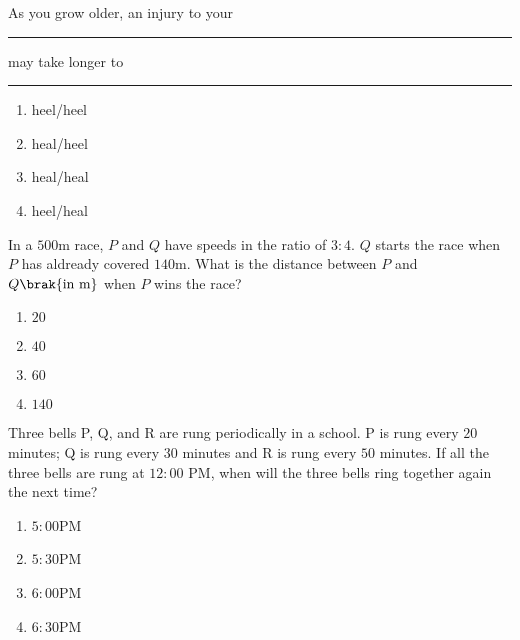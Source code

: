 \iffalse
	\title{2022-EE-1-13}
	\author{EE24Btech11006 - Arnav Mahishi}
	\section{ee}
	\chapter{2022}
\fi
\item{
As you grow older, an injury to your \rule{1cm}{0.15mm} may take longer to \rule{1cm}{0.15mm}
\begin{multicols}{4}
\begin{enumerate}
\item heel/heel
\item heal/heel
\item heal/heal 
\item heel/heal
\end{enumerate}
\end{multicols}
}
\item{
In a $500$m race, $P$ and $Q$ have speeds in the ratio of $3:4$. $Q$ starts the race when $P$ has aldready covered $140$m. What is the distance between $P$ and $Q\brak{\text{in m}}$ when $P$ wins the race?
\begin{multicols}{4}
\begin{enumerate}
\item $20$
\item $40$
\item $60$
\item $140$
\end{enumerate}
\end{multicols}}
\item{
Three bells P, Q, and R are rung periodically in a school. P is rung every $20$ minutes; Q is rung every $30$ minutes and R is rung every $50$ minutes.
If all the three bells are rung at $12:00$ PM, when will the three bells ring together again the next time?
\begin{multicols}{4}
\begin{enumerate}
\item $5:00$PM
\item $5:30$PM
\item $6:00$PM
\item $6:30$PM
\end{enumerate}
\end{multicols}
}
